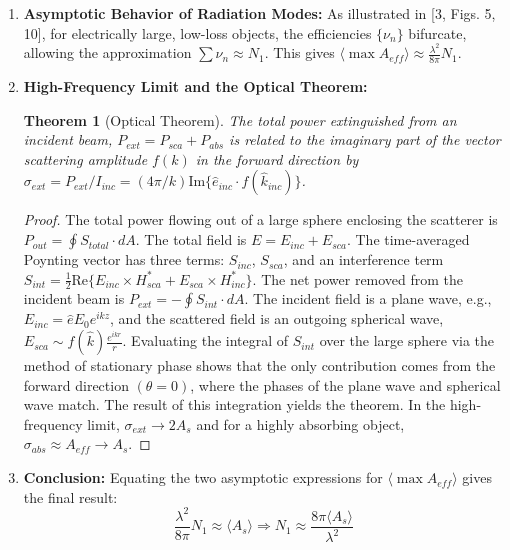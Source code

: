 \documentclass[11pt,a4paper]{article}
\newtheorem{theorem}{Theorem}[section]
\begin{document}
\begin{enumerate}
    \item \textbf{Asymptotic Behavior of Radiation Modes:} As illustrated in [3, Figs. 5, 10], for electrically large, low-loss objects, the efficiencies \(\{\nu_{n}\}\) bifurcate, allowing the approximation \(\sum\nu_{n}\approx N_{1}\). This gives \(\langle \max A_{eff}\rangle\approx\frac{\lambda^{2}}{8\pi}N_{1}\).
    
    \item \textbf{High-Frequency Limit and the Optical Theorem:}
    
    \begin{theorem}[Optical Theorem]
    The total power extinguished from an incident beam, \(P_{ext}=P_{sca}+P_{abs}\) is related to the imaginary part of the vector scattering amplitude \(f(k)\) in the forward direction by \(\sigma_{ext}=P_{ext}/I_{inc}=(4\pi/k)\text{Im}\{\hat{e}_{inc} \cdot f(\hat{k}_{inc})\}\).
    \end{theorem}
    
    \begin{proof}
    The total power flowing out of a large sphere enclosing the scatterer is \(P_{out}=\oint S_{total}\cdot dA\). The total field is \(E=E_{inc}+E_{sca}\). The time-averaged Poynting vector has three terms: \(S_{inc}\), \(S_{sca}\), and an interference term \(S_{int}=\frac{1}{2}\text{Re}\{E_{inc}\times H_{sca}^{*}+E_{sca}\times H_{inc}^{*}\}\). The net power removed from the incident beam is \(P_{ext}=-\oint S_{int}\cdot dA\). The incident field is a plane wave, e.g., \(E_{inc}=\hat{e}E_{0}e^{ikz}\), and the scattered field is an outgoing spherical wave, \(E_{sca}\sim f(\hat{k})\frac{e^{ikr}}{r}\). Evaluating the integral of \(S_{int}\) over the large sphere via the method of stationary phase shows that the only contribution comes from the forward direction \((\theta=0)\), where the phases of the plane wave and spherical wave match. The result of this integration yields the theorem. In the high-frequency limit, \(\sigma_{ext}\rightarrow2A_{s}\) and for a highly absorbing object, \(\sigma_{abs}\approx A_{eff}\rightarrow A_{s}\).
    \end{proof}
    
    \item \textbf{Conclusion:} Equating the two asymptotic expressions for \(\langle \max A_{eff}\rangle\) gives the final result:
    \begin{equation}
        \frac{\lambda^{2}}{8\pi}N_{1}\approx\langle A_{s}\rangle \Rightarrow N_{1}\approx\frac{8\pi\langle A_{s}\rangle}{\lambda^{2}}
    \end{equation}
\end{enumerate}
\end{document}
